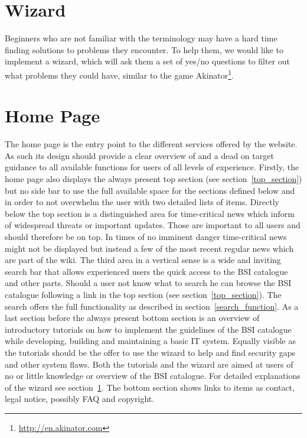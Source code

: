 \section{Wizard}
\label{wizard}
Beginners who are not familiar with the terminology may have a hard time finding solutions to problems they encounter. 
To help them, we would like to implement a wizard, which will ask them a set of yes/no questions to filter out what problems they could have, similar to the game Akinator\footnote{\url{http://en.akinator.com}}. 
 
\section{Home Page}
The home page is the entry point to the different services offered by the website. 
As such its design should provide a clear overview of and a dead on target guidance to all available functions for users of all levels of experience.
Firstly, the home page also displays the always present top section (see section~\ref{top_section}) but no side bar to use the full available space for the sections defined below and in order to not overwhelm the user with two detailed lists of items.
Directly below the top section is a distinguished area for time-critical news which inform of widespread threats or important updates.
Those are important to all users and should therefore be on top.
In times of no imminent danger time-critical news might not be displayed but instead a few of the most recent regular news which are part of the wiki.
The third area in a vertical sense is a wide and inviting search bar that allows experienced users the quick access to the BSI catalogue and other parts. 
Should a user not know what to search he can browse the BSI catalogue following a link in the top section (see section~\ref{top_section}).
The search offers the full functionality as described in section~\ref{search_function}.
As a last section before the always present bottom section is an overview of introductory tutorials on how to implement the guidelines of the BSI catalogue while developing, building and maintaining a basic IT system.
Equally visible as the tutorials should be the offer to use the wizard to help and find security gaps and other system flaws.
Both the tutorials and the wizard are aimed at users of no or little knowledge or overview of the BSI catalogue.
For detailed explanations of the wizard see section~\ref{wizard}.
The bottom section shows links to items as contact, legal notice, possibly FAQ and copyright.

